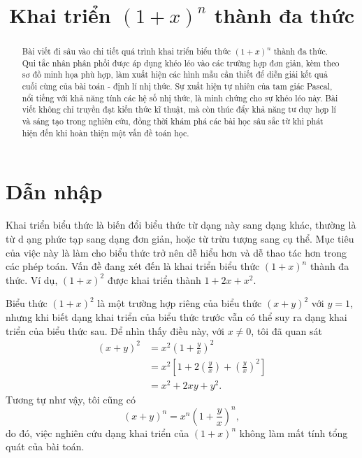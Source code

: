 \documentclass[12pt]{article} %
\title{Khai triển \texorpdfstring{\protect\((1+x)^n\)}{(1+x)\textasciicircum n} thành đa thức} %
\date{}
\begin{document}
\maketitle


\begin{abstract}
    Bài viết đi sâu vào chi tiết quá trình khai triển biểu thức \((1+x)^n\) thành đa thức. Qui tắc nhân phân phối được áp dụng khéo léo vào các trường hợp đơn giản, kèm theo sơ đồ minh họa phù hợp, làm xuất hiện các hình mẫu cần thiết để diễn giải kết quả cuối cùng của bài toán - định lí nhị thức. Sự xuất hiện tự nhiên của tam giác Pascal, nổi tiếng với khả năng tính các hệ số nhị thức, là minh chứng cho sự khéo léo này. Bài viết không chỉ truyền đạt kiến thức kĩ thuật, mà còn thúc đẩy khả năng tư duy hợp lí và sáng tạo trong nghiên cứu, đồng thời khám phá các bài học sâu sắc từ khi phát hiện đến khi hoàn thiện một vấn đề toán học.
\end{abstract}


\section{Dẫn nhập} \label{sec:dan-nhap}

Khai triển biểu thức là biến đổi biểu thức từ dạng này sang dạng khác, thường là từ d
ạng phức tạp sang dạng đơn giản, hoặc từ trừu tượng sang cụ thể. Mục tiêu của việc này là làm cho biểu thức trở nên dễ hiểu hơn và dễ thao tác hơn trong các phép toán. Vấn đề đang xét đến là khai triển biểu thức \((1+x)^n\) thành đa thức. Ví dụ, \((1+x)^2\) được khai triển thành \(1+2x+x^2\). 

Biểu thức \((1+x)^2\) là một trường hợp riêng của biểu thức \((x+y)^2\) với \(y=1\), nhưng khi biết dạng khai triển của biểu thức trước vẫn có thể suy ra dạng khai triển của biểu thức sau. Để nhìn thấy điều này, với \(x\ne 0\), tôi đã quan sát 
    \begin{align*}
        (x+y)^2
            &=x^2\left(1+\frac{y}{x}\right)^2 \\
            &=x^2\left[1+2\left(\frac{y}{x}\right)+\left(\frac{y}{x}\right)^2\right] \\
            &=x^2+2xy+y^2.
    \end{align*}
Tương tự như vậy, tôi cũng có 
\[(x+y)^n=x^n\left(1+\frac{y}{x}\right)^n,\]
do đó, việc nghiên cứu dạng khai triển của \((1+x)^n\) không làm mất tính tổng quát của bài toán.
\end{document}
